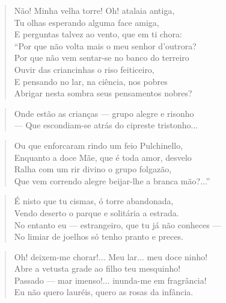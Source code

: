\begin{anexosenv}
\begin{verse}
Não! Minha velha torre! Oh! atalaia antiga, \\
Tu olhas esperando alguma face amiga, \\
E perguntas talvez ao vento, que em ti chora: \\
``Por que não volta mais o meu senhor d'outrora? \\
Por que não vem sentar-se no banco do terreiro \\
Ouvir das criancinhas o riso feiticeiro, \\
E pensando no lar, na ciência, nos pobres \\
Abrigar nesta sombra seus pensamentos nobres? \\
\end{verse}

\begin{verse}
Onde estão as crianças — grupo alegre e risonho \\
— Que escondiam-se atrás do cipreste tristonho... \\
\end{verse}

\begin{verse}
Ou que enforcaram rindo um feio Pulchinello, \\
Enquanto a doce Mãe, que é toda amor, desvelo \\
Ralha com um rir divino o grupo folgazão, \\
Que vem correndo alegre beijar-lhe a branca mão?...'' \\
\end{verse}

\begin{verse}
É nisto que tu cismas, ó torre abandonada, \\
Vendo deserto o parque e solitária a estrada. \\
No entanto eu — estrangeiro, que tu já não conheces — \\
No limiar de joelhos só tenho pranto e preces. \\
\end{verse}

\begin{verse}
Oh! deixem-me chorar!... Meu lar... meu doce ninho! \\
Abre a vetusta grade ao filho teu mesquinho! \\
Passado — mar imenso!... inunda-me em fragrância! \\
Eu não quero lauréis, quero as rosas da infância. \\
\end{verse}


\end{anexosenv}
